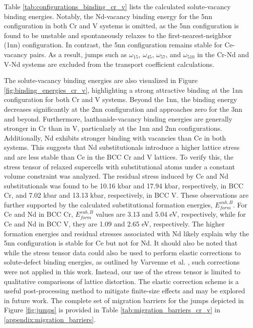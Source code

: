 \documentclass[preprint,12pt]{elsarticle}
\begin{document}
Table \ref{tab:configurations_binding_cr_v} lists the calculated solute-vacancy binding energies. Notably, the Nd-vacancy binding energy for the 5nn configuration in both Cr and V systems is omitted, as the 5nn configuration is found to be unstable and spontaneously relaxes to the first-nearest-neighbor (1nn) configuration. In contrast, the 5nn configuration remains stable for Ce-vacancy pairs. As a result, jumps such as $\omega_{15}$, $\omega_{45}$, $\omega_{57}$, and $\omega_{510}$ in the Cr-Nd and V-Nd systems are excluded from the transport coefficient calculations.

The solute-vacancy binding energies are also visualized in Figure \ref{fig:binding_energies_cr_v}, highlighting a strong attractive binding at the 1nn configuration for both Cr and V systems. Beyond the 1nn, the binding energy decreases significantly at the 2nn configuration and approaches zero for the 3nn and beyond. Furthermore, lanthanide-vacancy binding energies are generally stronger in Cr than in V, particularly at the 1nn and 2nn configurations. Additionally, Nd exhibits stronger binding with vacancies than Ce in both systems. This suggests that Nd substitutionals introduce a higher lattice stress and are less stable than Ce in the BCC Cr and V lattices. To verify this, the stress tensor of relaxed supercells with substitutional atoms under a constant volume constraint was analyzed. The residual stress induced by Ce and Nd substitutionals was found to be 10.16 kbar and 17.94 kbar, respectively, in BCC Cr, and 7.02 kbar and 13.13 kbar, respectively, in BCC V. These observations are further supported by the calculated substitutional formation energies, $E_{form}^{sub, B}$. For Ce and Nd in BCC Cr, $E_{form}^{sub, B}$ values are 3.13 and 5.04 eV, respectively, while for Ce and Nd in BCC V, they are 1.09 and 2.65 eV, respectively. The higher formation energies and residual stresses associated with Nd likely explain why the 5nn configuration is stable for Ce but not for Nd. It should also be noted that while the stress tensor data could also be used to perform elastic corrections to solute-defect binding energies, as outlined by Varvenne et al. \cite{varvenne_point_2013, varvenne_elastic_2017}, such corrections were not applied in this work. Instead, our use of the stress tensor is limited to qualitative comparisons of lattice distortion. The elastic correction scheme is a useful post-processing method to mitigate finite-size effects and may be explored in future work.
The complete set of migration barriers for the jumps depicted in Figure \ref{fig:jumps} is provided in Table \ref{tab:migration_barriers_cr_v} in \ref{appendix:migration_barriers}.
\end{document}

